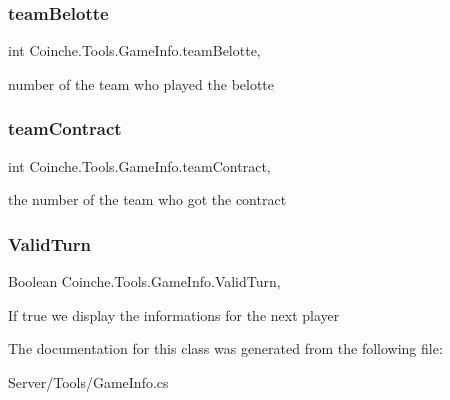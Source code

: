 \subsubsection{\texorpdfstring{team\+Belotte}{teamBelotte}}
{\footnotesize\ttfamily int Coinche.\+Tools.\+Game\+Info.\+team\+Belotte\hspace{0.3cm}{\ttfamily [get]}, {\ttfamily [set]}}



number of the team who played the belotte 

\mbox{\label{class_coinche_1_1_tools_1_1_game_info_ae516bdeec5b6602e12319890bbf4ee0c}} 
\subsubsection{\texorpdfstring{team\+Contract}{teamContract}}
{\footnotesize\ttfamily int Coinche.\+Tools.\+Game\+Info.\+team\+Contract\hspace{0.3cm}{\ttfamily [get]}, {\ttfamily [set]}}



the number of the team who got the contract 

\mbox{\label{class_coinche_1_1_tools_1_1_game_info_ad8e4babf051a6eb82792190097b50582}} 
\subsubsection{\texorpdfstring{Valid\+Turn}{ValidTurn}}
{\footnotesize\ttfamily Boolean Coinche.\+Tools.\+Game\+Info.\+Valid\+Turn\hspace{0.3cm}{\ttfamily [get]}, {\ttfamily [set]}}



If true we display the informations for the next player 



The documentation for this class was generated from the following file\+:\begin{DoxyCompactItemize}
\item 
Server/\+Tools/Game\+Info.\+cs\end{DoxyCompactItemize}
